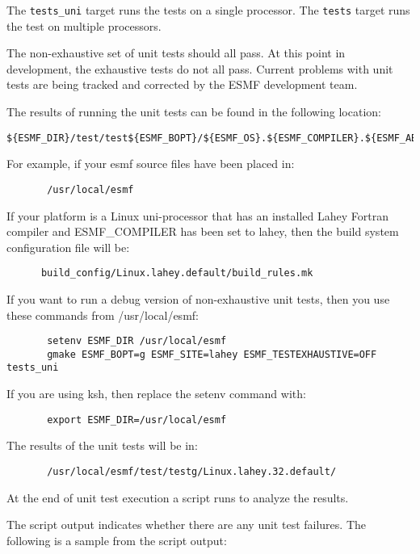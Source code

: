 The {\tt tests\_uni} target runs the tests on a single processor. 
The {\tt tests} target runs the test on multiple processors.

The non-exhaustive set of unit tests should all pass.  At this point in 
development, the exhaustive tests do not all pass.  Current problems with 
unit tests are being tracked and corrected by the ESMF development team.

The results of running the unit tests can be found in the following location:
\begin{verbatim}
${ESMF_DIR}/test/test${ESMF_BOPT}/${ESMF_OS}.${ESMF_COMPILER}.${ESMF_ABI}.${ESMF_SITE}
\end{verbatim}

For example, if your esmf source files have been placed in: 
\begin{verbatim}
       /usr/local/esmf
\end{verbatim}

If your platform is a Linux uni-processor that has an installed Lahey
Fortran compiler and ESMF\_COMPILER has been set to lahey, then the build
system configuration file will be:

\begin{verbatim}
      build_config/Linux.lahey.default/build_rules.mk
\end{verbatim}

If you want to run a debug version of non-exhaustive unit tests,
then you use these commands from /usr/local/esmf:

\begin{verbatim}
       setenv ESMF_DIR /usr/local/esmf
       gmake ESMF_BOPT=g ESMF_SITE=lahey ESMF_TESTEXHAUSTIVE=OFF tests_uni
\end{verbatim}


If you are using ksh, then replace the setenv command with:
\begin{verbatim}
       export ESMF_DIR=/usr/local/esmf
\end{verbatim}

The results of the unit tests will be in:
\begin{verbatim}
       /usr/local/esmf/test/testg/Linux.lahey.32.default/
\end{verbatim}

At the end of unit test execution a script runs to analyze the results.

The script output indicates whether there are any unit test failures.
The following is a sample from the script output:

